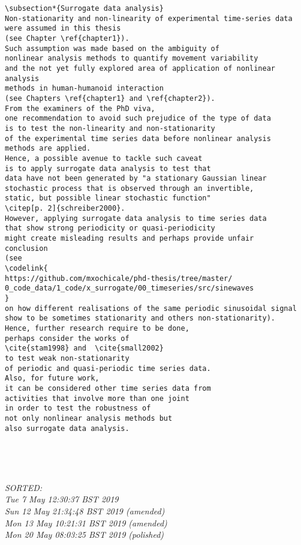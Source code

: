 \documentclass[12pt]{article}
\begin{document}
\begin{enumerate}
\begin{verbatim}
\subsection*{Surrogate data analysis}
Non-stationarity and non-linearity of experimental time-series data 
were assumed in this thesis 
(see Chapter \ref{chapter1}).
Such assumption was made based on the ambiguity of 
nonlinear analysis methods to quantify movement variability
and the not yet fully explored area of application of nonlinear analysis 
methods in human-humanoid interaction
(see Chapters \ref{chapter1} and \ref{chapter2}). 
From the examiners of the PhD viva, 
one recommendation to avoid such prejudice of the type of data  
is to test the non-linearity and non-stationarity  
of the experimental time series data before nonlinear analysis 
methods are applied.
Hence, a possible avenue to tackle such caveat 
is to apply surrogate data analysis to test that 
data have not been generated by "a stationary Gaussian linear
stochastic process that is observed through an invertible,
static, but possible linear stochastic function" 
\citep[p. 2]{schreiber2000}.
However, applying surrogate data analysis to time series data 
that show strong periodicity or quasi-periodicity 
might create misleading results and perhaps provide unfair 
conclusion 
(see 
\codelink{
https://github.com/mxochicale/phd-thesis/tree/master/
0_code_data/1_code/x_surrogate/00_timeseries/src/sinewaves
}
on how different realisations of the same periodic sinusoidal signal 
show to be sometimes stationarity and others non-stationarity).
Hence, further research require to be done,
perhaps consider the works of 
\cite{stam1998} and  \cite{small2002}
to test weak non-stationarity 
of periodic and quasi-periodic time series data.
Also, for future work, 
it can be considered other time series data from 
activities that involve more than one joint 
in order to test the robustness of 
not only nonlinear analysis methods but 
also surrogate data analysis.





	\end{verbatim}
	\textit{
	SORTED: \\ 
	Tue  7 May 12:30:37 BST 2019 \\
	Sun 12 May 21:34:48 BST 2019 (amended) \\
	Mon 13 May 10:21:31 BST 2019 (amended) \\
	Mon 20 May 08:03:25 BST 2019 (polished)
	}
	\\






\end{enumerate}
\end{document}
